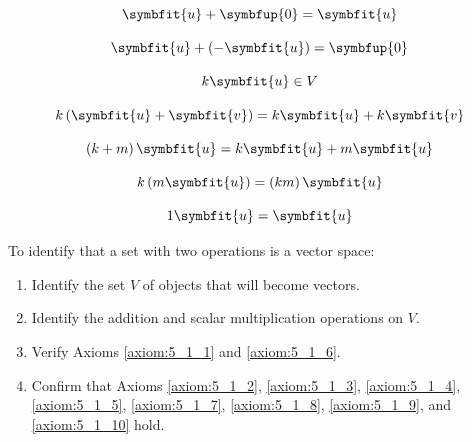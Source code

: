 \documentclass{article}
\begin{document}
	\begin{axiom} 
		\begin{equation*} \label{axiom:5_1_4}
			\symbfit{u} + \symbfup{0} = \symbfit{u}
		\end{equation*}
	\end{axiom}
	\begin{axiom} 
		\begin{equation*} \label{axiom:5_1_5}
			\symbfit{u} + \left(-\symbfit{u}\right) = \symbfup{0}
		\end{equation*}
	\end{axiom}
	\begin{axiom} 
		\begin{equation*} \label{axiom:5_1_6}
			k\symbfit{u} \in V
		\end{equation*}
	\end{axiom}
	\begin{axiom} 
		\begin{equation*} \label{axiom:5_1_7}
			k \left(\symbfit{u} + \symbfit{v}\right) = k\symbfit{u} + k\symbfit{v}
		\end{equation*}
	\end{axiom}
	\begin{axiom} 
		\begin{equation*}\label{axiom:5_1_8}
			\left(k+m\right)\symbfit{u} = k\symbfit{u} + m\symbfit{u}
		\end{equation*}
	\end{axiom}
	\begin{axiom} 
		\begin{equation*}\label{axiom:5_1_9}
			k\left(m\symbfit{u}\right)=\left(km\right)\symbfit{u}
		\end{equation*}
	\end{axiom}
	\begin{axiom} 
		\begin{equation*}\label{axiom:5_1_10}
			1 \symbfit{u}=\symbfit{u}
		\end{equation*}
	\end{axiom}
	\noindent To identify that a set with two operations is a vector space:
	\begin{enumerate}
		\item Identify the set $V$ of objects that will become vectors.
		\item Identify the addition and scalar multiplication operations on $V$.
		\item Verify Axioms \ref{axiom:5_1_1} and \ref{axiom:5_1_6}.
		\item Confirm that Axioms \ref{axiom:5_1_2}, \ref{axiom:5_1_3}, \ref{axiom:5_1_4}, \ref{axiom:5_1_5}, \ref{axiom:5_1_7}, \ref{axiom:5_1_8}, \ref{axiom:5_1_9}, and \ref{axiom:5_1_10} hold.
	\end{enumerate}
\end{document}
